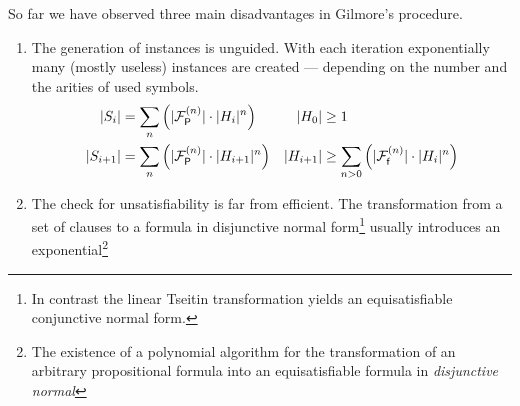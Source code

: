 So far we have observed three main disadvantages in Gilmore's procedure.
\begin{enumerate}
	\item\label{enum:gilmore:generation}
	The generation of instances is unguided.
	With each iteration exponentially many (mostly useless)
	instances are created
	--- depending on the number and the arities of used symbols.
	\begin{align*}
	\lvert S_{i} \rvert &= \sum_n \left( \lvert {\mathcal{F}^{(n)}_{\mathsf{P}}} \rvert\cdot \lvert H_{i}\rvert^n \right)
	&
	\lvert H_0 \rvert &\geq 1
	\\
	\lvert S_{i+1} \rvert &= \sum_n \left( \lvert {\mathcal{F}^{(n)}_{\mathsf{P}}} \rvert\cdot \lvert H_{i+1}\rvert^n \right)
	&
	\lvert H_{i+1}\rvert &\geq
	\sum_{n>0}\left(
	\lvert{\mathcal{F}^{(n)}_{\mathsf{f}}}\rvert\cdot\lvert H_i \rvert^n
	\right)
	\end{align*}
	\item\label{enum:gilmore:transformation}
	The check for unsatisfiability is far from efficient.
	The transformation from a set of clauses
	to a formula in disjunctive normal form\footnote{
		In contrast the linear Tseitin transformation yields an equisatisfiable conjunctive normal form.
	}
	usually introduces an exponential\footnote{
		The existence of a polynomial algorithm
		for the transformation of
		an arbitrary propositional formula into
		an equisatisfiable formula in \emph{disjunctive normal
}}
\end{enumerate}
